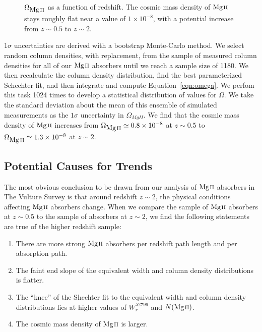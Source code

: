 \documentclass[iop,apj,numberedappendix,appendixfloats,twocolappendix]{emulateapj}
\begin{document}
\begin{figure}[bth]
\caption{$\Omega_{\hbox{{\rm Mg}\kern 0.1em{\sc ii}}}$ as a function of redshift. The cosmic mass density of ${\hbox{{\rm Mg}\kern 0.1em{\sc ii}}}$ stays roughly flat near a value of $1 \times 10^{-8}$, with a potential increase from $z \sim 0.5$ to $z \sim 2$.}
\label{fig:omegamgii}
\end{figure}

$1\sigma$ uncertainties are derived with a bootstrap Monte-Carlo method. We select random column densities, with replacement, from the sample of measured column densities for all of our ${\hbox{{\rm Mg}\kern 0.1em{\sc ii}}}$ absorbers until we reach a sample size of 1180. We then recalculate the column density distribution, find the best parameterized Schechter fit, and then integrate and compute Equation~\ref{eqn:omega}. We perfom this task 1024 times to develop a statistical distribution of values for $\Omega$. We take the standard deviation about the mean of this ensemble of simulated measurements as the $1\sigma$ uncertainty in $\Omega_{MgII}$. We find that the cosmic mass density of ${\hbox{{\rm Mg}\kern 0.1em{\sc ii}}}$ increases from $\Omega_{\hbox{{\rm Mg}\kern 0.1em{\sc ii}}} \simeq 0.8\times10^{-8}$ at $z \sim 0.5$ to $\Omega_{\hbox{{\rm Mg}\kern 0.1em{\sc ii}}} \simeq 1.3\times10^{-8}$ at $z \sim 2$. 

\subsection{Potential Causes for Trends}
\label{sec:trendcauses}

The most obvious conclusion to be drawn from our analysis of ${\hbox{{\rm Mg}\kern 0.1em{\sc ii}}}$ absorbers in The Vulture Survey is that around redshift $z \sim 2$, the physical conditions affecting ${\hbox{{\rm Mg}\kern 0.1em{\sc ii}}}$ absorbers change. When we compare the sample of ${\hbox{{\rm Mg}\kern 0.1em{\sc ii}}}$ absorbers at $z \sim 0.5$ to the sample of absorbers at $z \sim 2$, we find the following statements are true of the higher redshift sample:

\begin{enumerate}
\item There are more strong ${\hbox{{\rm Mg}\kern 0.1em{\sc ii}}}$ absorbers per redshift path length and per absorption path.
\item The faint end slope of the equivalent width and column density distributions is flatter.
\item The ``knee'' of the Shechter fit to the equivalent width and column density distributions lies at higher values of $W_r^{\lambda2796}$ and $N(\hbox{{\rm Mg}\kern 0.1em{\sc ii}})$.
\item The cosmic mass density of ${\hbox{{\rm Mg}\kern 0.1em{\sc ii}}}$ is larger.
\end{enumerate}
\end{document}
